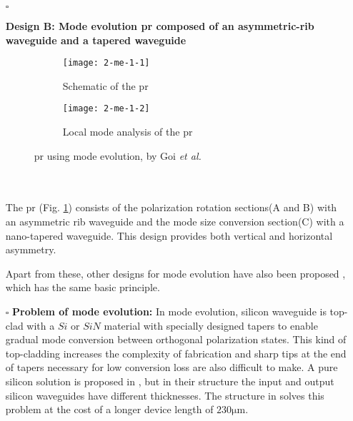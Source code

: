 \documentclass[../report.tex]{subfiles}
\begin{document}
\begin{itemize}[leftmargin=*]
	\item[$\square$] \begin{minipage}[t]{\textwidth}\textbf{Design B: Mode evolution \gls{pr} composed of an asymmetric-rib waveguide and a tapered waveguide}
	\begin{figure}[H] %
		\begin{subfigure}[t]{0.45\textwidth}
			\texttt{[image: 2-me-1-1]}
			\caption{Schematic of the \gls{pr}}
			\label{fig:2_me_1_1}
		\end{subfigure}
		\hfill
		\begin{subfigure}[t]{0.45\textwidth}
			\texttt{[image: 2-me-1-2]}
			\caption{Local mode analysis of the \gls{pr}}
			\label{fig:2_me_1_2}
		\end{subfigure}
		\caption{\gls{pr} using mode evolution, by Goi \textit{et al.} \cite{kazuhiro_integrated_2015}}
	\end{figure}
	\end{minipage}\\\\
	\noindent The \gls{pr} (Fig. \ref{fig:2_me_1_1}) consists of the polarization rotation sections(A and B) with an asymmetric rib waveguide and the mode size conversion section(C) with a nano-tapered waveguide. This design provides both vertical and horizontal asymmetry. \par
	 
	Apart from these, other designs for mode evolution have also been proposed \cite{chen_compact_2011,zhang_efficient_2012,justin_conference_2012}, which has the same basic principle.
	
	\item[$\square$] \textbf{Problem of mode evolution:} In mode evolution, silicon waveguide is top-clad with a $Si$ or $SiN$ material with specially designed tapers to enable gradual mode conversion between orthogonal polarization states. This kind of top-cladding increases the complexity of fabrication and sharp tips at the end of tapers necessary for low conversion loss are also difficult to make. A pure silicon solution is proposed in \cite{zhang_selected_2010}, but in their structure the input and output silicon waveguides have different thicknesses. The structure in \cite{kazuhiro_integrated_2015} solves this problem at the cost of a longer device length of $230 \si{\micro\meter}$.
\end{itemize}
\end{document}
